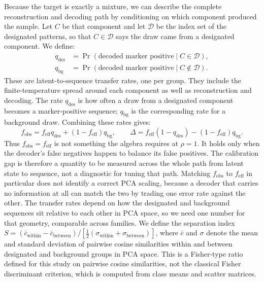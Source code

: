 Because the target is exactly a mixture, we can describe the complete reconstruction and
decoding path by conditioning on which component produced the sample.
Let $C$ be that component and let $\mathcal{D}$ be the index set of the designated patterns, so
that $C\in\mathcal{D}$ says the draw came from a designated component. We define:
\[
\begin{aligned}
q_{\mathrm{des}}
  &= \Pr(\text{decoded marker positive}\mid C\in\mathcal{D}),\\
q_{\mathrm{bg}}
  &= \Pr(\text{decoded marker positive}\mid C\notin\mathcal{D}).
\end{aligned}
\]
These are latent-to-sequence transfer rates, one per group. They include the
finite-temperature spread around each component as well as reconstruction and decoding.
The rate $q_{\mathrm{des}}$ is how often a draw from a designated component becomes a
marker-positive sequence; $q_{\mathrm{bg}}$ is the corresponding rate for a background draw.
Combining these rates gives:
\begin{equation}\label{eq:decoder-pushforward}
  f_{\mathrm{obs}}
  = f_{\mathrm{eff}}q_{\mathrm{des}}
  + (1-f_{\mathrm{eff}})q_{\mathrm{bg}},
  \qquad
  \Delta
  = f_{\mathrm{eff}}(1-q_{\mathrm{des}})
  - (1-f_{\mathrm{eff}})q_{\mathrm{bg}}.
\end{equation}
Thus $f_{\mathrm{obs}}=f_{\mathrm{eff}}$ is not something the algebra requires at
$\rho=1$. It holds only when the decoder's false negatives happen to balance its
false positives. The calibration gap is therefore a quantity to be measured across
the whole path from latent state to sequence, not a diagnostic for tuning that
path. Matching $f_{\mathrm{obs}}$ to $f_{\mathrm{eff}}$ in particular does not
identify a correct PCA scaling, because a decoder that carries no information at
all can match the two by trading one error rate against the other.
The transfer rates depend on how the designated and background sequences sit relative to each
other in PCA space, so we need one number for that geometry, comparable across families.
We define the separation index
$S = (\bar{c}_{\mathrm{within}} - \bar{c}_{\mathrm{between}}) /
[\tfrac{1}{2}(\sigma_{\mathrm{within}} + \sigma_{\mathrm{between}})]$, where $\bar{c}$ and
$\sigma$ denote the mean and standard deviation of pairwise cosine similarities within and
between designated and background groups in PCA space. This is a Fisher-type ratio defined for this study
on pairwise cosine similarities, not the classical Fisher discriminant criterion,
which is computed from class means and scatter matrices.
